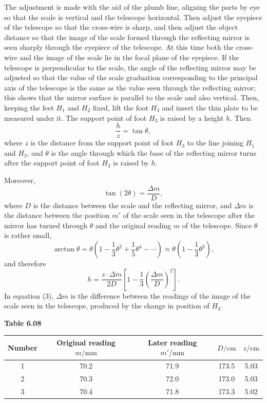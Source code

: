 The adjustment is made with the aid of the plumb line, aligning the parts by eye so that the scale is vertical and the telescope horizontal. Then adjust the eyepiece of the telescope so that the cross-wire is sharp, and then adjust the object distance so that the image of the scale formed through the reflecting mirror is seen sharply through the eyepiece of the telescope. At this time both the cross-wire and the image of the scale lie in the focal plane of the eyepiece. If the telescope is perpendicular to the scale, the angle of the reflecting mirror may be adjusted so that the value of the scale graduation corresponding to the principal axis of the telescope is the same as the value seen through the reflecting mirror; this shows that the mirror surface is parallel to the scale and also vertical. Then, keeping the feet $H_1$ and $H_2$ fixed, lift the foot $H_3$ and insert the thin plate to be measured under it. The support point of foot $H_3$ is raised by a height $h$. Then
\begin{equation}\tag{1}
\frac{h}{z}=\tan\theta,
\end{equation}
where $z$ is the distance from the support point of foot $H_3$ to the line joining $H_1$ and $H_2$, and $\theta$ is the angle through which the base of the reflecting mirror turns after the support point of foot $H_3$ is raised by $h$.

Moreover,
\begin{equation}\tag{2}
\tan(2\theta)=\frac{\Delta m}{D},
\end{equation}
where $D$ is the distance between the scale and the reflecting mirror, and $\Delta m$ is the distance between the position $m'$ of the scale seen in the telescope after the mirror has turned through $\theta$ and the original reading $m$ of the telescope. Since $\theta$ is rather small,
\begin{equation*}
\arctan\theta=\theta\left(1-\frac{1}{3}\theta^{2}+\frac{1}{5}\theta^{4}-\cdots\right)\approx\theta\left(1-\frac{1}{3}\theta^{2}\right),
\end{equation*}
and therefore
\begin{equation}\tag{3}
h=\frac{z\cdot\Delta m}{2D}\left[1-\frac{1}{3}\left(\frac{\Delta m}{D}\right)^{2}\right].
\end{equation}
In equation (3), $\Delta m$ is the difference between the readings of the image of the scale seen in the telescope, produced by the change in position of $H_3$.

\begin{center}
\textbf{Table 6.08}\\[3pt]
\begin{tabular}{ccccc}
\toprule
Number & Original reading $m/\mathrm{mm}$ & Later reading $m'/\mathrm{mm}$ & $D/\mathrm{cm}$ & $z/\mathrm{cm}$\\
\midrule
1 & 70.2 & 71.9 & 173.5 & 5.03\\
2 & 70.3 & 72.0 & 173.0 & 5.03\\
3 & 70.4 & 71.8 & 173.3 & 5.02\\
\bottomrule
\end{tabular}
\end{center}


